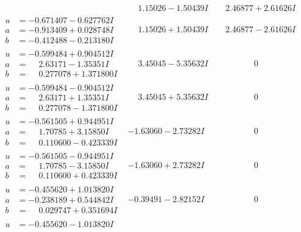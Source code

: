 \documentclass[1p]{elsarticle_modified}
\theoremstyle{definition}
\begin{document}
$$\begin{array}{c|c|c}
 & \phantom{-}1.15026 - 1.50439 I & \phantom{-}2.46877 + 2.61626 I \\ \hline\begin{aligned}
u &= -0.671407 - 0.627762 I \\
a &= -0.913409 + 0.028748 I \\
b &= -0.412488 - 0.213180 I\end{aligned}
 & \phantom{-}1.15026 + 1.50439 I & \phantom{-}2.46877 - 2.61626 I \\ \hline\begin{aligned}
u &= -0.599484 + 0.904512 I \\
a &= \phantom{-}2.63171 - 1.35351 I \\
b &= \phantom{-}0.277078 + 1.371800 I\end{aligned}
 & \phantom{-}3.45045 - 5.35632 I & \phantom{-0.000000 } 0 \\ \hline\begin{aligned}
u &= -0.599484 - 0.904512 I \\
a &= \phantom{-}2.63171 + 1.35351 I \\
b &= \phantom{-}0.277078 - 1.371800 I\end{aligned}
 & \phantom{-}3.45045 + 5.35632 I & \phantom{-0.000000 } 0 \\ \hline\begin{aligned}
u &= -0.561505 + 0.944951 I \\
a &= \phantom{-}1.70785 + 3.15850 I \\
b &= \phantom{-}0.110600 - 0.423339 I\end{aligned}
 & -1.63060 - 2.73282 I & \phantom{-0.000000 } 0 \\ \hline\begin{aligned}
u &= -0.561505 - 0.944951 I \\
a &= \phantom{-}1.70785 - 3.15850 I \\
b &= \phantom{-}0.110600 + 0.423339 I\end{aligned}
 & -1.63060 + 2.73282 I & \phantom{-0.000000 } 0 \\ \hline\begin{aligned}
u &= -0.455620 + 1.013820 I \\
a &= -0.238189 + 0.544842 I \\
b &= \phantom{-}0.029747 + 0.351694 I\end{aligned}
 & -0.39491 - 2.82152 I & \phantom{-0.000000 } 0 \\ \hline\begin{aligned}
u &= -0.455620 - 1.013820 I \\

\end{aligned}
\end{array}$$
\end{document}
